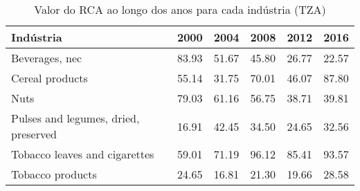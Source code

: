 \begin{table}
\centering
\caption{Valor do RCA ao longo dos anos para cada indústria (TZA)}
\label{tab:ex3-tempo-TZA}
\begin{tabular}{p{6cm}p{1.5cm}p{1.5cm}p{1.5cm}p{1.5cm}p{1.5cm}}
\toprule
                           Indústria &  2000 &  2004 &  2008 &  2012 &  2016 \\
\midrule
                      Beverages, nec & 83.93 & 51.67 & 45.80 & 26.77 & 22.57 \\
                     Cereal products & 55.14 & 31.75 & 70.01 & 46.07 & 87.80 \\
                                Nuts & 79.03 & 61.16 & 56.75 & 38.71 & 39.81 \\
Pulses and legumes, dried, preserved & 16.91 & 42.45 & 34.50 & 24.65 & 32.56 \\
       Tobacco leaves and cigarettes & 59.01 & 71.19 & 96.12 & 85.41 & 93.57 \\
                    Tobacco products & 24.65 & 16.81 & 21.30 & 19.66 & 28.58 \\
\bottomrule
\end{tabular}
\end{table}

